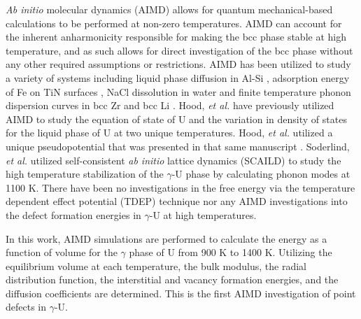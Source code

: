 \documentclass[review]{elsarticle}
\begin{document}
\textit{Ab initio} molecular dynamics (AIMD) allows for quantum mechanical-based calculations to be performed at non-zero temperatures. AIMD can account for the inherent anharmonicity responsible for making the bcc phase stable at high temperature, and as such allows for direct investigation of the bcc phase without any other required assumptions or restrictions.  AIMD has been utilized to study a variety of systems including liquid phase diffusion in Al-Si \cite{manga2018}, adsorption energy of Fe on TiN surfaces \cite{wang2010}, NaCl dissolution in water \cite{timko2010} and finite temperature phonon dispersion curves in bcc Zr and bcc Li \cite{hellman2011}. Hood, \textit{et al.} \cite{hood2008} have previously utilized AIMD to study the equation of state of U and the variation in density of states for the liquid phase of U at two unique temperatures. Hood, \textit{et al.} utilized a unique pseudopotential that was presented in that same manuscript \cite{hood2008}. Soderlind, \textit{et al.} \cite{soderlind2012} utilized self-consistent \textit{ab initio} lattice dynamics (SCAILD) to study the high temperature stabilization of the $\gamma$-U phase by calculating phonon modes at 1100 K. There have been no investigations in the free energy via the temperature dependent effect potential (TDEP) technique \cite{hellman2013} nor any AIMD investigations into the defect formation energies in $\gamma$-U at high temperatures. 

In this work, AIMD simulations are performed to calculate the energy as a function of volume for the $\gamma$ phase of U from 900 K to 1400 K. Utilizing the equilibrium volume at each temperature, the bulk modulus, the radial distribution function, the interstitial and vacancy formation energies, and the diffusion coefficients are determined. This is the first AIMD investigation of point defects in $\gamma$-U. 
\end{document}
